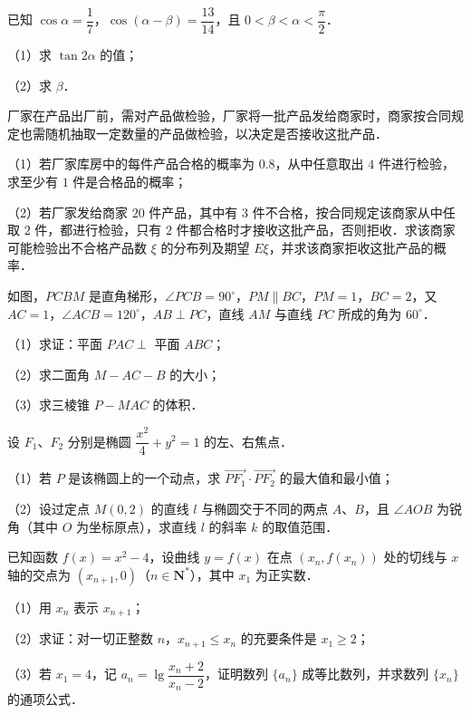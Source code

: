 \begin{question}
已知 $\cos\alpha=\dfrac17$，$\cos(\alpha-\beta)=\dfrac{13}{14}$，且 $0<\beta<\alpha<\dfrac{\pi}{2}$．

（1）求 $\tan2\alpha$ 的值；

（2）求 $\beta$．

\end{question}
\begin{question}
厂家在产品出厂前，需对产品做检验，厂家将一批产品发给商家时，商家按合同规定也需随机抽取一定数量的产品做检验，以决定是否接收这批产品．

（1）若厂家库房中的每件产品合格的概率为 $0.8$，从中任意取出 $4$ 件进行检验，求至少有 $1$ 件是合格品的概率；

（2）若厂家发给商家 $20$ 件产品，其中有 $3$ 件不合格，按合同规定该商家从中任取 $2$ 件，都进行检验，只有 $2$ 件都合格时才接收这批产品，否则拒收．求该商家可能检验出不合格产品数 $\xi$ 的分布列及期望 $E\xi$，并求该商家拒收这批产品的概率．

\Needspace{0.4\textheight}
\end{question}
\begin{question}
如图，$PCBM$ 是直角梯形，$\angle PCB=90^\circ$，$PM\parallel BC$，$PM=1$，$BC=2$，又 $AC=1$，$\angle ACB=120^\circ$，$AB\perp PC$，直线 $AM$ 与直线 $PC$ 所成的角为 $60^\circ$．
\nopagebreak[4]
\begin{center}\end{center}
\nopagebreak[4]
（1）求证：平面 $PAC\perp$ 平面 $ABC$；

（2）求二面角 $M-AC-B$ 的大小；

（3）求三棱锥 $P-MAC$ 的体积．

\end{question}
\begin{question}
设 $F_1$、$F_2$ 分别是椭圆 $\dfrac{x^2}{4}+y^2=1$ 的左、右焦点．

（1）若 $P$ 是该椭圆上的一个动点，求 $\overrightarrow{PF_1}\cdot\overrightarrow{PF_2}$ 的最大值和最小值；

（2）设过定点 $M(0,2)$ 的直线 $l$ 与椭圆交于不同的两点 $A$、$B$，且 $\angle AOB$ 为锐角（其中 $O$ 为坐标原点），求直线 $l$ 的斜率 $k$ 的取值范围．

\end{question}
\begin{question}
已知函数 $f(x)=x^2-4$，设曲线 $y=f(x)$ 在点 $(x_n,f(x_n))$ 处的切线与 $x$ 轴的交点为 $(x_{n+1},0)$（$n\in\mathbf N^*$），其中 $x_1$ 为正实数．

（1）用 $x_n$ 表示 $x_{n+1}$；

（2）求证：对一切正整数 $n$，$x_{n+1}\leqslant x_n$ 的充要条件是 $x_1\geqslant2$；

（3）若 $x_1=4$，记 $a_n=\lg\dfrac{x_n+2}{x_n-2}$，证明数列 $\{a_n\}$ 成等比数列，并求数列 $\{x_n\}$ 的通项公式．

\end{question}
